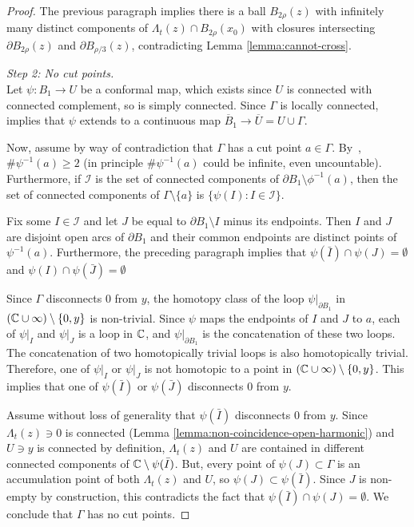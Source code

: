 \documentclass[12pt]{amsart}
\numberwithin{equation}{section}
\newcommand{\cluster}[2]{\hyperref[eq:non-co-set]{\mathit{\Lambda}^{#1}_{#2}}}
\begin{document}
\begin{proof}
		The previous paragraph implies there is a ball $B_{2\rho}(z)$ with infinitely many distinct components of ${\cluster{}{t}(z)} \cap B_{2 \rho}(x_0)$ with closures intersecting $\partial B_{2\rho}(z)$ and $\partial B_{\rho/3}(z)$, contradicting Lemma \ref{lemma:cannot-cross}. 
		
		
		{\it Step 2: No cut points.} \\
		Let $\psi : B_1 \to U$ be a conformal map, which exists since $U$ is connected with connected complement, so is simply connected. Since $\Gamma$ is locally connected,~\cite[Theorem 2.1]{pommerenke2013boundary} implies that $\psi$ extends to a continuous map $\overline B_1 \to \overline U = U \cup \Gamma$. 
		
		Now, assume by way of contradiction that $\Gamma$ has a cut point $a \in \Gamma$. By~\cite[Proposition 2.5]{pommerenke2013boundary}, $\# \psi^{-1}(a) \geq 2$ (in principle $\#\psi^{-1}(a) $ could be infinite, even uncountable).
		Furthermore, if $\mathcal I$ is the set of connected components of $\partial B_1 \setminus \phi^{-1}(a)$, then the set of connected components of $\Gamma \setminus \{a\}$ is $\{\psi(I) : I\in \mathcal I\}$. 
		
		Fix some $I\in\mathcal I$ and let $J$ be equal to $\partial B_1 \setminus I$ minus its endpoints. 
		Then $I$ and $J$ are disjoint open arcs of $\partial B_1$ and their common endpoints are distinct points of $\psi^{-1}(a)$.  
		Furthermore, the preceding paragraph implies that $\psi(\bar I) \cap \psi(J) = \emptyset$ and  $\psi(I) \cap \psi(\bar J) = \emptyset$
		
		Since $\Gamma$ disconnects $0$ from $y$, the homotopy class of the loop $\psi|_{\partial B_1}$ in $(\mathbb{C} \cup \infty) \setminus \{0,y\}$ is non-trivial.
		Since $\psi$ maps the endpoints of $I$ and $J$ to $a$, each of $\psi|_I$ and $\psi|_J$ is a loop in $\mathbb{C}$, and $\psi|_{\partial B_1}$ is the concatenation of these two loops. 
		The concatenation of two homotopically trivial loops is also homotopically trivial.
		Therefore, one of $\psi|_I$ or $\psi|_J$ is not homotopic to a point in $(\mathbb{C} \cup \infty)\setminus \{0,y\}$. 
		This implies that one of $\psi(\bar I)$ or $\psi(\bar J)$ disconnects $0$ from $y$.   
		
		Assume without loss of generality that $\psi(\bar I)$ disconnects $0$ from $y$. 
		Since ${\cluster{}{t}(z)} \ni 0$ is connected (Lemma \ref{lemma:non-coincidence-open-harmonic}) and $U \ni y$ is connected by definition, ${\cluster{}{t}(z)}$ and $U$ are contained in different connected components of $\mathbb{C}\setminus \psi(\bar I)$. 
		But, every point of $\psi(J) \subset \Gamma$ is an accumulation point of both ${\cluster{}{t}(z)}$ and $U$, so $\psi(J) \subset \psi(\bar I)$. 
		Since $J$ is non-empty by construction, this contradicts the fact that $\psi(\bar I) \cap \psi(J) = \emptyset$.
		We conclude that $\Gamma$ has no cut points.
	\end{proof}
	
\end{document}
